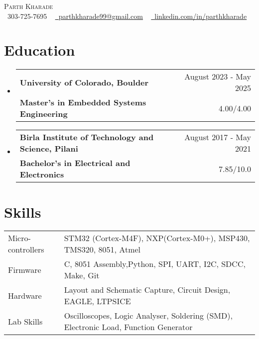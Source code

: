 \documentclass[a4,11pt]{article}
\makeatletter
\newcommand{\resumeSubheading}[4]{
  \vspace{-2pt}\item
    \begin{tabular*}{1.0\textwidth}[t]{l@{\extracolsep{\fill}}r}
       {\large \textbf{#1}} &  {\large #2} \\
      \textbf{#3} & { #4} \\
    \end{tabular*}\vspace{-1pt}
}
\newcommand{\resumeSubHeadingListStart}{\begin{itemize}[leftmargin=0.0in, label={}]}
\newcommand{\resumeSubHeadingListEnd}{\end{itemize}}
\makeatother
\begin{document}
\begin{center}
    {\Huge \scshape Parth Kharade} \\ \vspace{1pt}
    \small \raisebox{-0.1\height}\faPhone\ 303-725-7695 ~ \href{mailto:parthkharade99@gmail.com}{\raisebox{-0.2\height}\faEnvelope\  \underline{parthkharade99@gmail.com}} ~ 
    \href{https://www.linkedin.com/in/parth-k-081287184/}{\raisebox{-0.2\height}\faLinkedin\ \underline{linkedin.com/in/parthkharade}}  ~
    \vspace{-16pt}
\end{center}


\section{Education}
  \resumeSubHeadingListStart
    \resumeSubheading
      {University of Colorado, Boulder}{August 2023 - May 2025}
      {Master's in Embedded Systems Engineering}{4.00/4.00}
    \resumeSubheading
      {Birla Institute of Technology and Science, Pilani}{August 2017 - May 2021}
      {Bachelor's in Electrical and Electronics}{7.85/10.0}
  \resumeSubHeadingListEnd
 \vspace{-16pt}
 \section{Skills}
 \vspace{-4mm}
\begin{table}[!htb]
    \begin{tabular}{ m{3.1cm} | m{16cm} } 
      {Micro-controllers}&{\: STM32 (Cortex-M4F), NXP(Cortex-M0+), MSP430, TMS320, 8051, Atmel} \\
      {Firmware}&{\: C, 8051 Assembly,Python, SPI, UART, I2C, SDCC, Make, Git} \\
      {Hardware}&{\: Layout and Schematic Capture, Circuit Design, EAGLE, LTPSICE} \\
      {Lab Skills}&{\: Oscilloscopes, Logic Analyser, Soldering (SMD), Electronic Load, Function Generator} \\
    \end{tabular}
\end{table}
 \vspace{-16pt}

\end{document}
